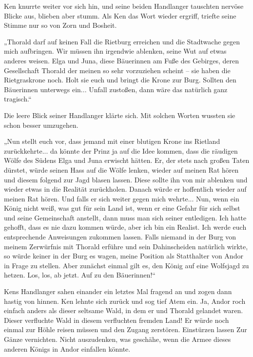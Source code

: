 Ken knurrte weiter vor sich hin, und seine beiden Handlanger tauschten nervöse Blicke aus, blieben aber stumm. Als Ken das Wort wieder ergriff, triefte seine Stimme nur so von Zorn und Bosheit.

„Thorald darf auf keinen Fall die Rietburg erreichen und die Stadtwache gegen mich aufbringen. Wir müssen ihn irgendwie ablenken, seine Wut auf etwas anderes weisen. Elga und Juna, diese Bäuerinnen am Fuße des Gebirges, deren Gesellschaft Thorald der meinen so sehr vorzuziehen scheint – sie haben die Rietgraskrone noch. Holt sie euch und bringt die Krone zur Burg. Sollten den Bäuerinnen unterwegs ein... Unfall zustoßen, dann wäre das natürlich ganz tragisch.“

Die leere Blick seiner Handlanger klärte sich. Mit solchen Worten wussten sie schon besser umzugehen.

„Nun stellt euch vor, dass jemand mit einer blutigen Krone ins Rietland zurückkehrte... da könnte der Prinz ja auf die Idee kommen, dass die räudigen Wölfe des Südens Elga und Juna erwischt hätten. Er, der stets nach großen Taten dürstet, würde seinen Hass auf die Wölfe lenken, wieder auf meinen Rat hören und diesem folgend zur Jagd blasen lassen. Diese sollte ihn von mir ablenken und wieder etwas in die Realität zurückholen. Danach würde er hoffentlich wieder auf meinen Rat hören. Und falls er sich weiter gegen mich wehrte... Nun, wenn ein König nicht weiß, was gut für sein Land ist, wenn er eine Gefahr für sich selbst und seine Gemeinschaft anstellt, dann muss man sich seiner entledigen. Ich hatte gehofft, dass es nie dazu kommen würde, aber ich bin ein Realist. Ich werde euch entsprechende Anweisungen zukommen lassen. Falls niemand in der Burg von meinem Zerwürfnis mit Thorald erführe und sein Dahinscheiden natürlich wirkte, so würde keiner in der Burg es wagen, meine Position als Statthalter von Andor in Frage zu stellen. Aber zunächst einmal gilt es, den König auf eine Wolfsjagd zu hetzen. Los, los, ab jetzt. Auf zu den Bäuerinnen!“

Kens Handlanger sahen einander ein letztes Mal fragend an und zogen dann hastig von hinnen. Ken lehnte sich zurück und sog tief Atem ein. Ja, Andor roch einfach anders als dieser seltsame Wald, in dem er und Thorald gelandet waren. Dieser verfluchte Wald in diesem verfluchten fremden Land! Er würde noch einmal zur Höhle reisen müssen und den Zugang zerstören. Einstürzen lassen Zur Gänze vernichten. Nicht auszudenken, was geschähe, wenn die Armee dieses anderen Königs in Andor einfallen könnte.

